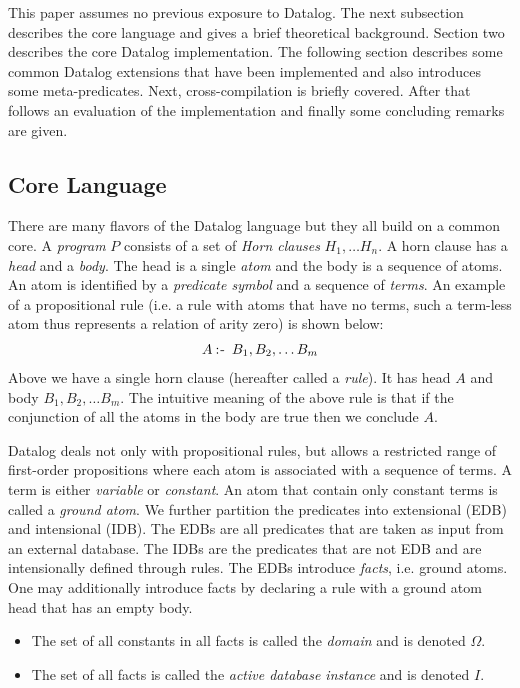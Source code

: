This paper assumes no previous exposure to Datalog. The next subsection describes the core language and gives a brief theoretical background. Section two describes the core Datalog implementation. The following section describes some common Datalog extensions that have been implemented and also introduces some meta-predicates. Next, cross-compilation is briefly covered. After that follows an evaluation of the implementation and finally some concluding remarks are given.

\subsection{Core Language}
There are many flavors of the Datalog language but they all build on a common core. A \textit{program} $P$ consists of a set of \textit{Horn clauses} $H_1, \ldots H_n$. A horn clause has a \textit{head} and a \textit{body}. The head is a single \textit{atom} and the body is a sequence of atoms. An atom is identified by a \textit{predicate symbol} and a sequence of \textit{terms}. An example of a propositional rule (i.e. a rule with atoms that have no terms, such a term-less atom thus represents a relation of arity zero) is shown below:
\begin{align*}
A \mathbin{:\hspace{-0.5ex}\textsf{-}} \;B_1, B_2, \ldots B_m
\end{align*}
\noindent
Above we have a single horn clause (hereafter called a \textit{rule}). It has head $A$ and body $B_1, B_2, \ldots B_m$. The intuitive meaning of the above rule is that if the conjunction of all the atoms in the body are true then we conclude $A$.

Datalog deals not only with propositional rules, but allows a restricted range of first-order propositions where each atom is associated with a sequence of terms. A term is either \textit{variable} or \textit{constant}. An atom that contain only constant terms is called a \textit{ground atom}. We further partition the predicates into extensional (EDB) and intensional (IDB). The EDBs are all predicates that are taken as input from an external database. The IDBs are the predicates that are not EDB and are intensionally defined through rules. The EDBs introduce \textit{facts}, i.e. ground atoms. One may additionally introduce facts by declaring a rule with a ground atom head that has an empty body. 

\begin{itemize}
\item The set of all constants in all facts is called the \textit{domain} and is denoted $\Omega$.
\item The set of all facts is called the \textit{active database instance} and is denoted $I$.
\end{itemize}
 
